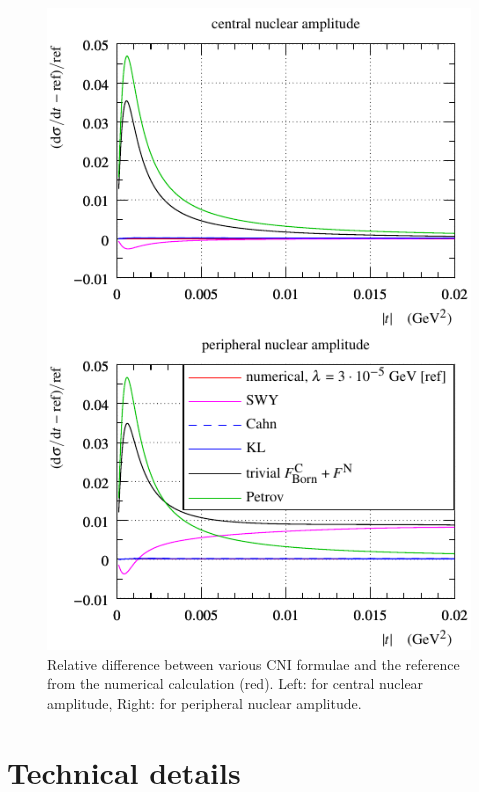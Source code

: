 \documentclass[pdftex,twocolumn,epjc3]{svjour3}
\begin{document}
\begin{figure}[h]
\begin{center}
\includegraphics{fig/cni_dsdt_cmp_formula.pdf}
\caption{Relative difference between various CNI formulae and the reference from the numerical calculation (red). Left: for central nuclear amplitude, Right: for peripheral nuclear amplitude.}
\label{f:sig form}
\end{center}
\end{figure}



\section{Technical details}
\label{sec:technical}
\end{document}
